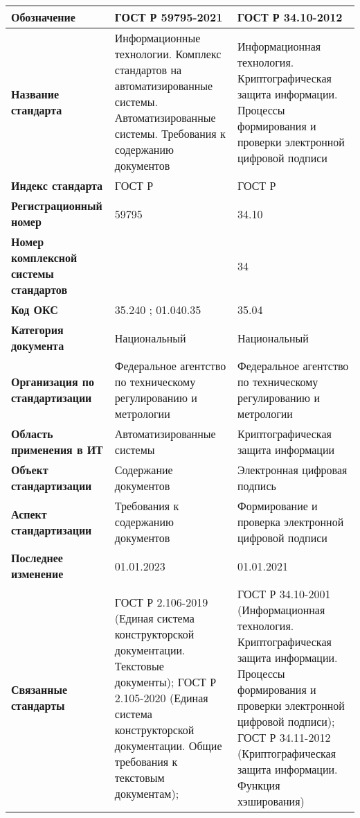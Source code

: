 \begin{table}[h!tp]
	\centering
	\caption{}
	\label{table:national}
	\begin{tabular}{|p{10em}|p{11em}|p{11em}|}
		\hline
		\textbf{Обозначение}
			& \textbf{ГОСТ Р 59795-2021} & \textbf{ГОСТ Р 34.10-2012} \\ \hline
		\textbf{Название стандарта}
			& Информационные технологии. Комплекс стандартов на автоматизированные системы. Автоматизированные системы. Требования к содержанию документов
			& Информационная технология. Криптографическая защита информации. Процессы формирования и проверки электронной цифровой подписи \\ \hline
		\textbf{Индекс стандарта}
			& ГОСТ Р & ГОСТ Р \\ \hline
		\textbf{Регистрационный номер}
			& 59795 & 34.10 \\ \hline
		\textbf{Номер комплексной системы стандартов}
			& & 34 \\ \hline
		\textbf{Код ОКС}
			& 35.240 ; 01.040.35 & 35.04 \\ \hline
		\textbf{Категория документа}
			& Национальный & Национальный \\ \hline
		\textbf{Организация по стандартизации}
			& Федеральное агентство по техническому регулированию и метрологии
			& Федеральное агентство по техническому регулированию и метрологии \\ \hline
		\textbf{Область применения в ИТ}
			& Автоматизированные системы
			& Криптографическая защита информации \\ \hline
		\textbf{Объект стандартизации}
			& Содержание документов & Электронная цифровая подпись \\ \hline
		\textbf{Аспект стандартизации}
			& Требования к содержанию документов
			& Формирование и проверка электронной цифровой подписи \\ \hline
		\textbf{Последнее изменение}
			& 01.01.2023 & 01.01.2021 \\ \hline
		\textbf{Связанные стандарты}
			& ГОСТ Р 2.106-2019 (Единая система конструкторской документации.
			Текстовые документы);
			ГОСТ Р 2.105-2020 (Единая система конструкторской документации.
			Общие требования к текстовым документам);
			& ГОСТ Р 34.10-2001 (Информационная технология.
			Криптографическая защита информации.
			Процессы формирования и проверки электронной цифровой подписи);
			ГОСТ Р 34.11-2012 (Криптографическая защита информации.
			Функция хэширования) \\ \hline
	\end{tabular}
\end{table}

